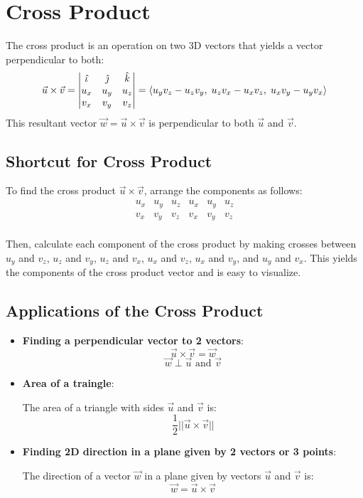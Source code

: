 \section{Cross Product}
The cross product is an operation on two 3D vectors that yields a vector perpendicular to both:
\begin{equation}\label{Cross Product}
    \vec{u} \times \vec{v} = 
    \begin{vmatrix}
        \hat{\iota} & \hat{\jmath} & \hat{k} \\
        u_x & u_y & u_z \\
        v_x & v_y & v_z \\
    \end{vmatrix} 
    = \langle u_y v_z - u_z v_y, \; u_z v_x - u_x v_z, \; u_x v_y - u_y v_x \rangle
\end{equation}
This resultant vector \(\vec{w} = \vec{u} \times \vec{v}\) is perpendicular to both \(\vec{u}\) and \(\vec{v}\).
\subsection{Shortcut for Cross Product}

To find the cross product \(\vec{u} \times \vec{v}\), arrange the components as follows:
\[
\begin{array}{|cccccc|}
    u_x & u_y & u_z & u_x & u_y & u_z \\
    v_x & v_y & v_z & v_x & v_y & v_z \\
\end{array}
\]

Then, calculate each component of the cross product by making crosses between $u_y$ and $v_z$, $u_z$ and $v_y$, $u_z$ and $v_x$, $u_x$ and $v_z$, $u_x$ and $v_y$, and $u_y$ and $v_x$. This yields the components of the cross product vector and is easy to visualize.
\subsection{Applications of the Cross Product}
\begin{itemize}
    \item \textbf{Finding a perpendicular vector to 2 vectors}:
    \[
        \vec{u} \times \vec{v} = \vec{w}
    \]
    \[
        \vec{w} \perp \vec{u} \text{ and } \vec{v} 
    \]
    \item \textbf{Area of a traingle}:
    
    The area of a triangle with sides \(\vec{u}\) and \(\vec{v}\) is:
    \[
        \dfrac{1}{2} ||\vec{u} \times \vec{v}||
    \]
    \item \textbf{Finding 2D direction in a plane given by 2 vectors or 3 points}:
    
    The direction of a vector \(\vec{w}\) in a plane given by vectors \(\vec{u}\) and \(\vec{v}\) is:
    \[
        \vec{w} = \vec{u} \times \vec{v}
    \]
\end{itemize}
